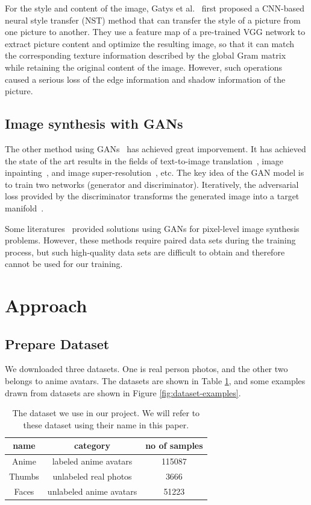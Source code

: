 \documentclass[10pt,twocolumn,letterpaper]{article}
\begin{document}
For the style and content of the image, Gatys et al.~\cite{NST} first proposed a
CNN-based neural style transfer (NST) method that can transfer the style of a
picture from one picture to another. They use a feature map of a pre-trained VGG
network to extract picture content and optimize the resulting image, so that it
can match the corresponding texture information described by the global Gram
matrix~\cite{gatys2015texture} while retaining the original content of the
image. However, such operations caused a serious loss of the edge information
and shadow information of the picture.

\subsection{Image synthesis with GANs}
The other method using GANs~\cite{GAN} has achieved great imporvement.
It has achieved the state of the art results in the fields of text-to-image
translation~\cite{reed2016generative}, image inpainting~\cite{yeh2016semantic},
and image super-resolution~\cite{ledig2017photo}, etc. The key idea of the GAN
model is to train two networks (generator and discriminator). Iteratively, the
adversarial loss provided by the discriminator transforms the generated image
into a target manifold~\cite{yeh2016semantic}.

Some literatures~\cite{dumoulin2016adversarially,isola2017image,
karacan2016learning} provided solutions using GANs for pixel-level image
synthesis problems. However, these methods require paired data sets during the
training process, but such high-quality data sets are difficult to obtain and
therefore cannot be used for our training.

\section{Approach}

\subsection{Prepare Dataset}

We downloaded three datasets. One is real person photos, and the other two
belongs to anime avatars. The datasets are shown in Table \ref{tab:datasets},
and some examples drawn from datasets are shown in Figure
\ref{fig:dataset-examples}.

\begin{table}[h]
   \centering
   \begin{tabular}{|c|c|c|}
   \hline
   name & category & no of samples \\ \hline
   Anime & labeled anime avatars & 115087 \\ \hline
   Thumbs & unlabeled real photos & 3666 \\ \hline
   Faces & unlabeled anime avatars & 51223 \\ \hline
   \end{tabular}
   \caption{The dataset we use in our project. We will refer to these dataset
   using their name in this paper.}
   \label{tab:datasets}
\end{table}
\end{document}
